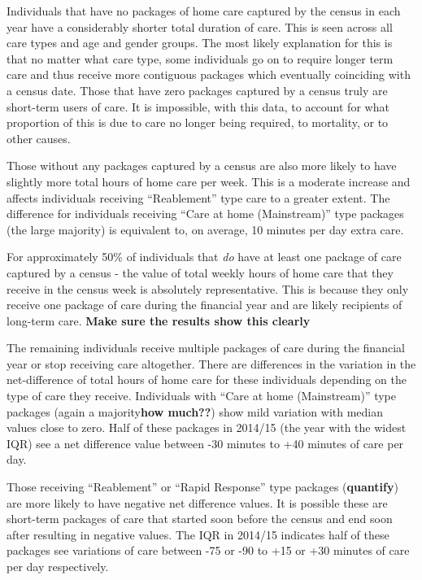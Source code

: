 \documentclass[]{article}
\begin{document}
Individuals that have no packages of home care captured by the census in
each year have a considerably shorter total duration of care. This is
seen across all care types and age and gender groups. The most likely
explanation for this is that no matter what care type, some individuals
go on to require longer term care and thus receive more contiguous
packages which eventually coinciding with a census date. Those that have
zero packages captured by a census truly are short-term users of care.
It is impossible, with this data, to account for what proportion of this
is due to care no longer being required, to mortality, or to other
causes.

Those without any packages captured by a census are also more likely to
have slightly more total hours of home care per week. This is a moderate
increase and affects individuals receiving ``Reablement'' type care to a
greater extent. The difference for individuals receiving ``Care at home
(Mainstream)'' type packages (the large majority) is equivalent to, on
average, 10 minutes per day extra care.

For approximately 50\% of individuals that \emph{do} have at least one
package of care captured by a census - the value of total weekly hours
of home care that they receive in the census week is absolutely
representative. This is because they only receive one package of care
during the financial year and are likely recipients of long-term care.
\textbf{Make sure the results show this clearly}

The remaining individuals receive multiple packages of care during the
financial year or stop receiving care altogether. There are differences
in the variation in the net-difference of total hours of home care for
these individuals depending on the type of care they receive.
Individuals with ``Care at home (Mainstream)'' type packages (again a
majority\textbf{how much??}) show mild variation with median values
close to zero. Half of these packages in 2014/15 (the year with the
widest IQR) see a net difference value between -30 minutes to +40
minutes of care per day.

Those receiving ``Reablement'' or ``Rapid Response'' type packages
(\textbf{quantify}) are more likely to have negative net difference
values. It is possible these are short-term packages of care that
started soon before the census and end soon after resulting in negative
values. The IQR in 2014/15 indicates half of these packages see
variations of care between -75 or -90 to +15 or +30 minutes of care per
day respectively.
\end{document}
